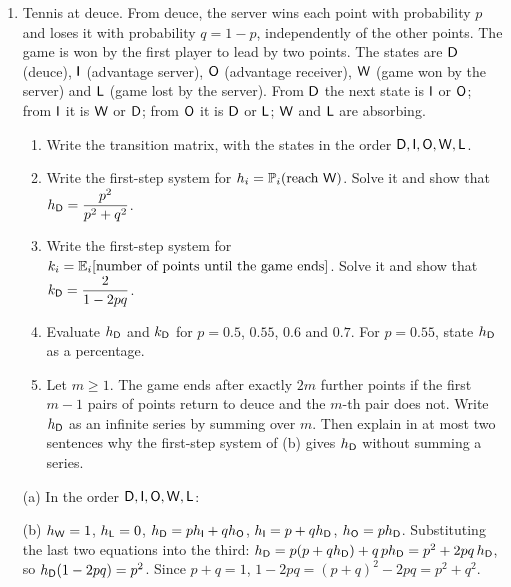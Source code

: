 \begin{enumerate}[resume*=quiz]
\item Tennis at deuce. From deuce, the server wins each point with probability $p$ and loses it with probability $q=1-p$, independently of the other points. The game is won by the first player to lead by two points. The states are $\mathsf{D}$ (deuce), $\mathsf{I}$ (advantage server), $\mathsf{O}$ (advantage receiver), $\mathsf{W}$ (game won by the server) and $\mathsf{L}$ (game lost by the server). From $\mathsf{D}$ the next state is $\mathsf{I}$ or $\mathsf{O}$; from $\mathsf{I}$ it is $\mathsf{W}$ or $\mathsf{D}$; from $\mathsf{O}$ it is $\mathsf{D}$ or $\mathsf{L}$; $\mathsf{W}$ and $\mathsf{L}$ are absorbing.
\begin{enumerate}[label=(\alph*),leftmargin=2em]
\item Write the transition matrix, with the states in the order $\mathsf{D},\mathsf{I},\mathsf{O},\mathsf{W},\mathsf{L}$.
\item Write the first-step system for $h_i=\mathbb{P}_i(\text{reach }\mathsf{W})$. Solve it and show that $h_{\mathsf{D}}=\dfrac{p^2}{p^2+q^2}$.
\item Write the first-step system for $k_i=\mathbb{E}_i[\text{number of points until the game ends}]$. Solve it and show that $k_{\mathsf{D}}=\dfrac{2}{1-2pq}$.
\item Evaluate $h_{\mathsf{D}}$ and $k_{\mathsf{D}}$ for $p=0.5$, $0.55$, $0.6$ and $0.7$. For $p=0.55$, state $h_{\mathsf{D}}$ as a percentage.
\item Let $m\ge1$. The game ends after exactly $2m$ further points if the first $m-1$ pairs of points return to deuce and the $m$-th pair does not. Write $h_{\mathsf{D}}$ as an infinite series by summing over $m$. Then explain in at most two sentences why the first-step system of (b) gives $h_{\mathsf{D}}$ without summing a series.
\end{enumerate}
\begin{solution}
(a) In the order $\mathsf{D},\mathsf{I},\mathsf{O},\mathsf{W},\mathsf{L}$:

(b) $h_{\mathsf{W}}=1$, $h_{\mathsf{L}}=0$, $h_{\mathsf{D}}=ph_{\mathsf{I}}+qh_{\mathsf{O}}$, $h_{\mathsf{I}}=p+qh_{\mathsf{D}}$, $h_{\mathsf{O}}=ph_{\mathsf{D}}$.
Substituting the last two equations into the third: $h_{\mathsf{D}}=p(p+qh_{\mathsf{D}})+q\,ph_{\mathsf{D}}=p^2+2pq\,h_{\mathsf{D}}$, so $h_{\mathsf{D}}(1-2pq)=p^2$. Since $p+q=1$, $1-2pq=(p+q)^2-2pq=p^2+q^2$.


\end{solution}
\end{enumerate}
